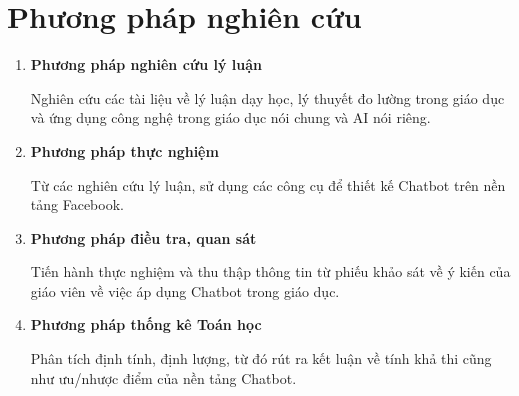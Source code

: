 \section{Phương pháp nghiên cứu}
\begin{enumerate}[label=\textbf{\thesection.\arabic*.},align=left,left=0cm..1cm]
	\item \textbf{Phương pháp nghiên cứu lý luận}\par
	Nghiên cứu các tài liệu về lý luận dạy học, lý thuyết đo lường trong giáo dục và ứng dụng công nghệ trong giáo dục nói chung và AI nói riêng.
	\item \textbf{Phương pháp thực nghiệm}\par
	Từ các nghiên cứu lý luận, sử dụng các công cụ để thiết kế Chatbot trên nền tảng Facebook.
	\item \textbf{Phương pháp điều tra, quan sát} \par
	Tiến hành thực nghiệm và thu thập thông tin từ phiếu khảo sát về ý kiến của giáo viên về việc áp dụng Chatbot trong giáo dục.
	\item \textbf{Phương pháp thống kê Toán học} \par
	Phân tích định tính, định lượng, từ đó rút ra kết luận về tính khả thi cũng như ưu/nhược điểm của nền tảng Chatbot.
\end{enumerate}

\renewcommand*{\thesection}{\arabic{chapter}.\arabic{section}}
\renewcommand*{\thesubsection}{\arabic{chapter}.\arabic{section}.\arabic{subsection}}
